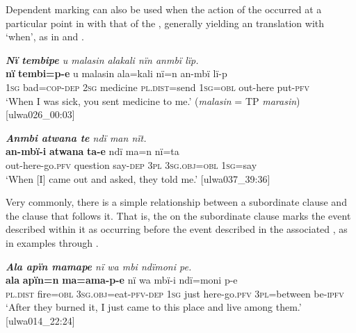 Dependent marking  can also be used when the action of the  occurred at a particular point in   with that of the , generally yielding an  translation with ‘when’, as in  and .

\ea%
    \label{ex:complex:56}
          \textit{\textbf{Nï tembipe} u malasin alakali nïn anmbï lïp.}\\
\gll    \textbf{nï}    \textbf{tembi=p-e}    u    malasin  ala=kali    nï=n     an-mbï    lï-p\\
    1\textsc{sg}  bad=\textsc{cop{}-dep}  \textsc{2sg}  medicine  \textsc{pl.dist}=send  1\textsc{sg=obl}    out-here  put-\textsc{pfv}\\
\glt `When I was sick, you sent medicine to me.’ (\textit{malasin} = TP \textit{marasin}) [ulwa026\_00:03]
\z

\ea%
    \label{ex:complex:57}
          \textit{\textbf{Anmbi atwana te} ndï man nït.}\\
\gll    \textbf{an-mbï-i}      \textbf{atwana}  \textbf{ta-e}     ndï  ma=n      nï=ta\\
    out-here-go\textsc{.pfv}  question  say-\textsc{dep}  \textsc{3pl}  \textsc{3sg.obj=obl}  \textsc{1sg=}say\\
\glt `When [I] came out and asked, they told me.’ [ulwa037\_39:36]
\z

Very commonly, there is a simple   relationship between a subordinate clause and the clause that follows it. That is, the  on the subordinate clause marks the event described within it as occurring before the event described in the associated , as in examples  through .

\newpage

\ea%
    \label{ex:complex:58}
          \textit{\textbf{Ala apïn mamape} nï wa mbi ndïmoni pe.}\\
\gll    \textbf{ala}      \textbf{apïn=n}    \textbf{ma=ama-p-e}      nï    wa      mbï-i      ndï=moni    p-e\\
    \textsc{pl.dist}  fire=\textsc{obl}  3\textsc{sg.obj}=eat-\textsc{pfv-dep}  \textsc{1sg}  just    here-go\textsc{.pfv}  \textsc{3pl}=between  be-\textsc{ipfv}\\
\glt `After they burned it, I just came to this place and live among them.’ [ulwa014\_22:24]
\z

